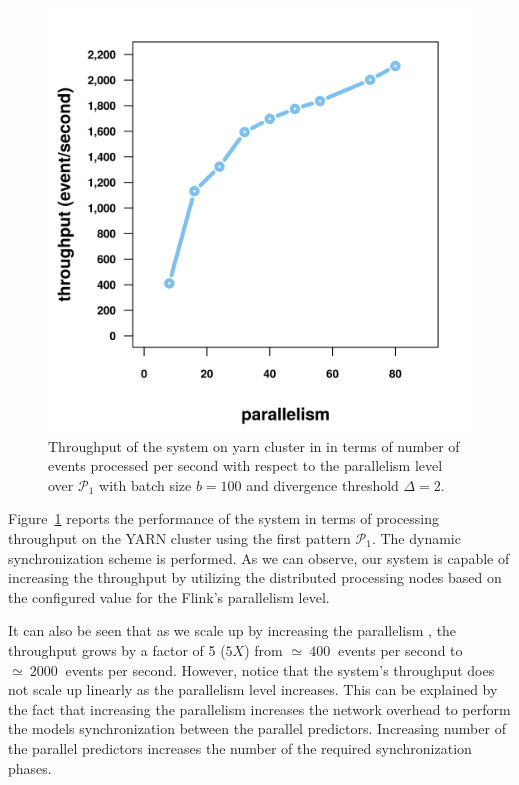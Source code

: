\begin{figure}[H]
	
	\includegraphics[width=\textwidth,keepaspectratio]{chapters/figures/throughput/temp.png}
	
	\caption{Throughput of the system on \ac{yarn} cluster in in terms of number of events processed per second with respect to the parallelism level over $\mathcal{P}_1$ with batch size $b=100$ and divergence threshold $\Delta=2$.}
	\label{fig:throughput}
\end{figure}


Figure~\ref{fig:throughput} reports the performance of the system  in terms of processing throughput on the YARN cluster using the first pattern $\mathcal{P}_1$. The dynamic synchronization scheme is performed. As we can observe, our system is capable of increasing the throughput by utilizing the distributed processing nodes based on the configured value for the Flink's parallelism level. 
\par It can also be seen that as we scale up by increasing the parallelism , the throughput grows by a factor of 5 ($5X$) from $\simeq\ 400\ $ events per second to $\simeq\ 2000\ $ events per second. However, notice that the system's throughput does not scale up linearly as the parallelism level increases. This can be explained by the fact that increasing the parallelism increases the network overhead to perform the models synchronization between the parallel predictors. Increasing number of the parallel predictors increases the number of the required synchronization phases.














